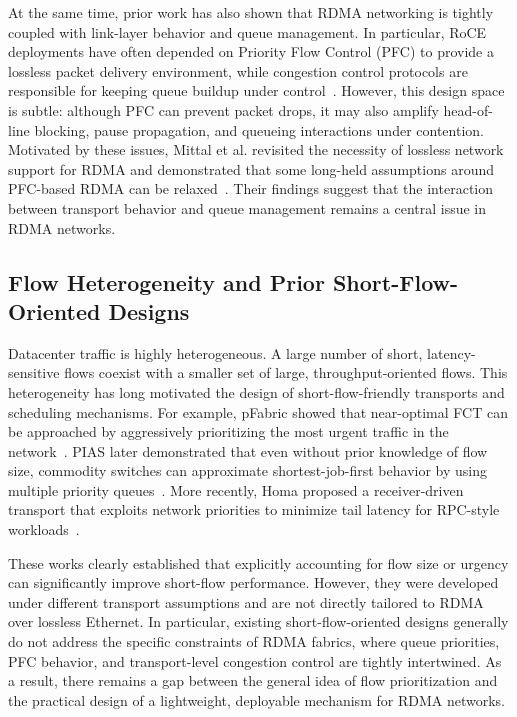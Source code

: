 \documentclass[conference]{IEEEtran}
\begin{document}
At the same time, prior work has also shown that RDMA networking is tightly coupled with link-layer behavior and queue management. In particular, RoCE deployments have often depended on Priority Flow Control (PFC) to provide a lossless packet delivery environment, while congestion control protocols are responsible for keeping queue buildup under control~\cite{dcqcn,timely}. However, this design space is subtle: although PFC can prevent packet drops, it may also amplify head-of-line blocking, pause propagation, and queueing interactions under contention. Motivated by these issues, Mittal et al. revisited the necessity of lossless network support for RDMA and demonstrated that some long-held assumptions around PFC-based RDMA can be relaxed~\cite{revisiting-rdma}. Their findings suggest that the interaction between transport behavior and queue management remains a central issue in RDMA networks.

\subsection{Flow Heterogeneity and Prior Short-Flow-Oriented Designs}

Datacenter traffic is highly heterogeneous. A large number of short, latency-sensitive flows coexist with a smaller set of large, throughput-oriented flows. This heterogeneity has long motivated the design of short-flow-friendly transports and scheduling mechanisms. For example, pFabric showed that near-optimal FCT can be approached by aggressively prioritizing the most urgent traffic in the network~\cite{pfabric}. PIAS later demonstrated that even without prior knowledge of flow size, commodity switches can approximate shortest-job-first behavior by using multiple priority queues~\cite{pias}. More recently, Homa proposed a receiver-driven transport that exploits network priorities to minimize tail latency for RPC-style workloads~\cite{homa}.

These works clearly established that explicitly accounting for flow size or urgency can significantly improve short-flow performance. However, they were developed under different transport assumptions and are not directly tailored to RDMA over lossless Ethernet. In particular, existing short-flow-oriented designs generally do not address the specific constraints of RDMA fabrics, where queue priorities, PFC behavior, and transport-level congestion control are tightly intertwined. As a result, there remains a gap between the general idea of flow prioritization and the practical design of a lightweight, deployable mechanism for RDMA networks.
\end{document}
